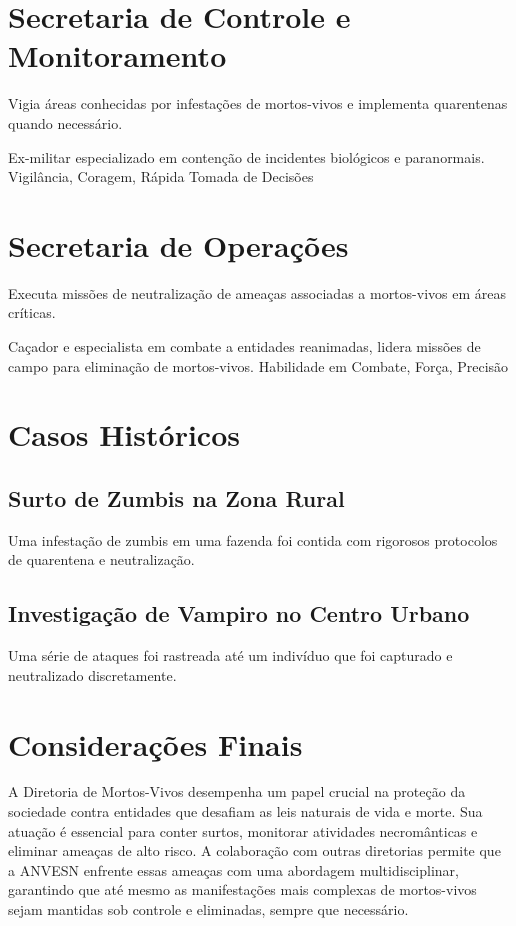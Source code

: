 \section{Secretaria de Controle e Monitoramento}
Vigia áreas conhecidas por infestações de mortos-vivos e implementa quarentenas quando necessário.

{Ex-militar especializado em contenção de incidentes biológicos e paranormais.}
{Vigilância, Coragem, Rápida Tomada de Decisões}

\section{Secretaria de Operações}
Executa missões de neutralização de ameaças associadas a mortos-vivos em áreas críticas.

{Caçador e especialista em combate a entidades reanimadas, lidera missões de campo para eliminação de mortos-vivos.}
{Habilidade em Combate, Força, Precisão}

\section{Casos Históricos}

\subsection{Surto de Zumbis na Zona Rural} Uma infestação de zumbis em uma fazenda foi contida com rigorosos protocolos de quarentena e neutralização.

\subsection{Investigação de Vampiro no Centro Urbano} Uma série de ataques foi rastreada até um indivíduo que foi capturado e neutralizado discretamente.

\section{Considerações Finais}

A Diretoria de Mortos-Vivos desempenha um papel crucial na proteção da sociedade contra entidades que desafiam as leis naturais de vida e morte. Sua atuação é essencial para conter surtos, monitorar atividades necromânticas e eliminar ameaças de alto risco. A colaboração com outras diretorias permite que a ANVESN enfrente essas ameaças com uma abordagem multidisciplinar, garantindo que até mesmo as manifestações mais complexas de mortos-vivos sejam mantidas sob controle e eliminadas, sempre que necessário.

